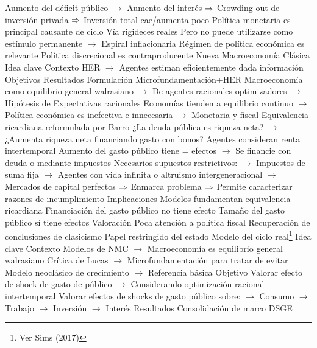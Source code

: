 \documentclass{nuevotema}
\begin{document}
\begin{esquemal}
				\4[] Aumento del déficit público
				\4[] $\to$ Aumento del interés
				\4[] $\Rightarrow$ Crowding-out de inversión privada
				\4[] $\Rightarrow$ Inversión total cae/aumenta poco
				\4 Política monetaria es principal causante de ciclo
				\4[] Vía rigideces reales
				\4[] Pero no puede utilizarse como estímulo permanente
				\4[] $\to$ Espiral inflacionaria
				\4 Régimen de política económica es relevante
				\4[] Política discrecional es contraproducente
		\2 Nueva Macroeconomía Clásica
			\3 Idea clave
				\4 Contexto
				\4[] HER
				\4[] $\to$ Agentes estiman eficientemente dada información
				\4[]
				\4 Objetivos
				\4 Resultados
			\3 Formulación
				\4 Microfundamentación+HER
				\4[] Macroeconomía como equilibrio general walrasiano
				\4[] $\to$ De agentes racionales optimizadores
				\4[] $\to$ Hipótesis de Expectativas racionales
				\4 Economías tienden a equilibrio continuo
				\4[] $\to$ Política económica es inefectiva e innecesaria
				\4[] $\to$ Monetaria y fiscal
				\4 Equivalencia ricardiana reformulada por Barro
				\4[] ¿La deuda pública es riqueza neta?
				\4[] $\to$ ¿Aumenta riqueza neta financiando gasto con bonos?
				\4[] Agentes consideran renta intertemporal
				\4[] Aumento del gasto público tiene = efectos
				\4[] $\to$ Se financie con deuda o mediante impuestos
				\4[] Necesarios supuestos restrictivos:
				\4[] $\to$ Impuestos de suma fija
				\4[] $\to$ Agentes con vida infinita o altruismo intergeneracional
				\4[] $\to$ Mercados de capital perfectos
				\4[] $\Rightarrow$ Enmarca problema
				\4[] $\Rightarrow$ Permite caracterizar razones de incumplimiento
			\3 Implicaciones
				\4 Modelos fundamentan equivalencia ricardiana
				\4[] Financiación del gasto público no tiene efecto
				\4[] Tamaño del gasto público sí tiene efectos
			\3 Valoración
				\4 Poca atención a política fiscal
				\4 Recuperación de conclusiones de clasicismo
				\4[] Papel restringido del estado
		\2 Modelo del ciclo real\footnote{Ver Sims (2017)}
			\3 Idea clave
				\4 Contexto
				\4[] Modelos de NMC
				\4[] $\to$ Macroeconomía es equilibrio general walrasiano
				\4[] Crítica de Lucas
				\4[] $\to$ Microfundamentación para tratar de evitar
				\4[] Modelo neoclásico de crecimiento
				\4[] $\to$ Referencia básica
				\4 Objetivo
				\4[] Valorar efecto de shock de gasto de público
				\4[] $\to$ Considerando optimización racional intertemporal
				\4[] Valorar efectos de shocks de gasto público sobre:
				\4[] $\to$ Consumo
				\4[] $\to$ Trabajo
				\4[] $\to$ Inversión
				\4[] $\to$ Interés
				\4 Resultados
				\4[] Consolidación de marco DSGE

\end{esquemal}
\end{document}
